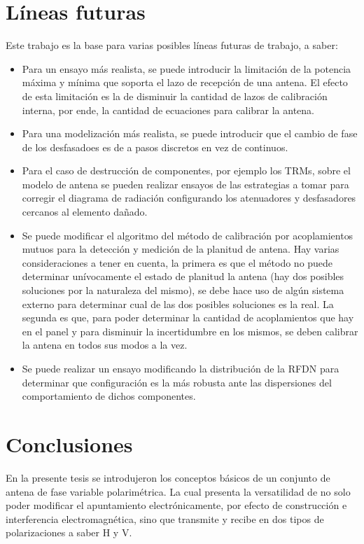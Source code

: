 \section{Líneas futuras}

Este trabajo es la base para varias posibles líneas futuras de trabajo, a saber:
\begin{itemize}
	\item Para un ensayo más realista, se puede introducir la limitación de la potencia máxima y mínima que soporta el lazo 
		de recepción de una antena. El efecto de esta limitación es la de disminuir la cantidad de lazos de calibración interna, 
		por ende, la cantidad de ecuaciones para calibrar la antena.
	\item Para una modelización más realista, se puede introducir que el cambio de fase de los desfasadoes es de a pasos discretos
		en vez de continuos.
	\item Para el caso de destrucción de componentes, por ejemplo los TRMs, sobre el modelo de antena se pueden realizar ensayos 
		de las estrategias a tomar para corregir el diagrama de radiación configurando los atenuadores y desfasadores cercanos al 
		elemento dañado.
	\item Se puede modificar el algoritmo del método de calibración por acoplamientos mutuos para la detección y medición de 
		la planitud de antena. Hay varias consideraciones a tener en cuenta, la primera es que el método no puede determinar 
		unívocamente el estado de planitud la antena (hay dos posibles soluciones por la naturaleza del mismo), se debe hace uso de 
		algún sistema externo para determinar cual de las dos posibles soluciones es la real. La segunda es que, para poder determinar
		la cantidad de acoplamientos que hay en el panel y para disminuir la incertidumbre en los mismos, se deben calibrar la antena 
		en todos sus modos a la vez.
	\item Se puede realizar un ensayo modificando la distribución de la RFDN para determinar que configuración es la más robusta ante 
		las dispersiones del comportamiento de dichos componentes.
\end{itemize}

\section{Conclusiones}

En la presente tesis se introdujeron los conceptos básicos de un conjunto de antena de fase variable polarimétrica. La cual 
presenta la versatilidad de no solo poder modificar el apuntamiento electrónicamente, por efecto de construcción e interferencia 
electromagnética, sino que transmite y recibe en dos tipos de polarizaciones a saber H y V.


